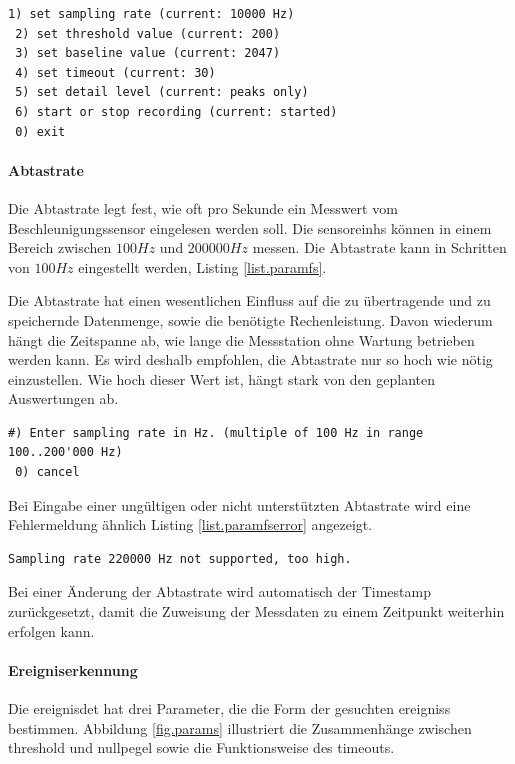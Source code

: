 \begin{lstlisting}[caption=Untermenü Sensor-Parameter, label=list.sensorparam]
 1) set sampling rate (current: 10000 Hz)
 2) set threshold value (current: 200)
 3) set baseline value (current: 2047)
 4) set timeout (current: 30)
 5) set detail level (current: peaks only)
 6) start or stop recording (current: started)
 0) exit
\end{lstlisting}

\paragraph{Abtastrate} Die Abtastrate legt fest, wie oft pro Sekunde ein Messwert vom Beschleunigungssensor eingelesen werden soll. Die \glspl{sensoreinh} können in einem Bereich zwischen \ensuremath{100 Hz} und \ensuremath{200000 Hz} messen. Die Abtastrate kann in Schritten von \ensuremath{100 Hz} eingestellt werden, Listing \ref{list.paramfs}.

Die Abtastrate hat einen wesentlichen Einfluss auf die zu übertragende und zu speichernde Datenmenge, sowie die benötigte Rechenleistung. Davon wiederum hängt die Zeitspanne ab, wie lange die Messstation ohne Wartung betrieben werden kann. Es wird deshalb empfohlen, die Abtastrate nur so hoch wie nötig einzustellen. Wie hoch dieser Wert ist, hängt stark von den geplanten Auswertungen ab.

\begin{lstlisting}[caption=Untermenü Abtastrate, label=list.paramfs]
 #) Enter sampling rate in Hz. (multiple of 100 Hz in range 100..200'000 Hz)
 0) cancel
\end{lstlisting}

Bei Eingabe einer ungültigen oder nicht unterstützten Abtastrate wird eine Fehlermeldung ähnlich Listing \ref{list.paramfserror} angezeigt.

\begin{lstlisting}[caption=Fehlermeldung bei ungültiger Abtastrate, label=list.paramfserror]
Sampling rate 220000 Hz not supported, too high.
\end{lstlisting}

Bei einer Änderung der Abtastrate wird automatisch der Timestamp zurückgesetzt, damit die Zuweisung der Messdaten zu einem Zeitpunkt weiterhin erfolgen kann.

\paragraph{Ereigniserkennung} Die \gls{ereignisdet} hat drei Parameter, die die Form der gesuchten \glspl{ereignis} bestimmen.  Abbildung \ref{fig.params} illustriert die Zusammenhänge zwischen \gls{threshold} und \gls{nullpegel} sowie die Funktionsweise des \gls{timeout}s.


